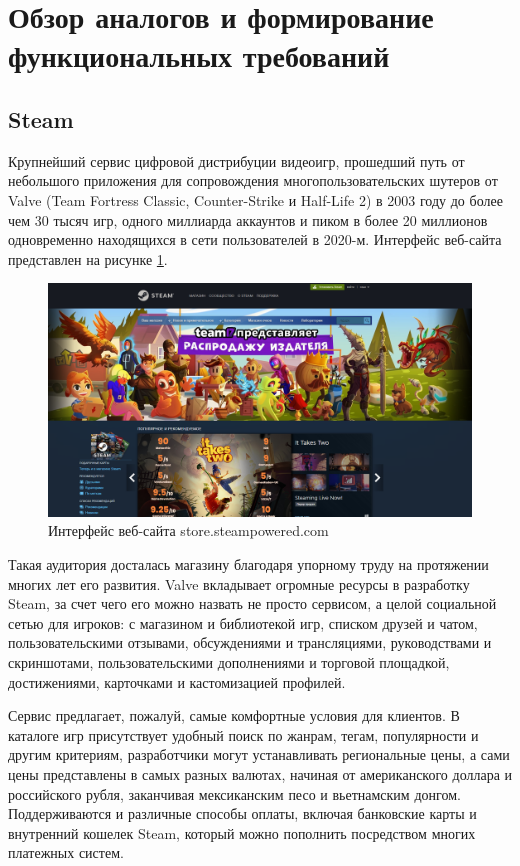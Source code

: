 \section{Обзор аналогов и формирование функциональных требований}
\label{sec:analogues}

\subsection{Steam}
\label{sec:analogues:steam}

Крупнейший сервис цифровой дистрибуции видеоигр, прошедший путь от небольшого приложения для сопровождения многопользовательских шутеров от Valve (Team Fortress Classic, Counter-Strike и Half-Life 2) в 2003 году до более чем 30 тысяч игр, одного миллиарда аккаунтов и пиком в более 20 миллионов одновременно находящихся в сети пользователей в 2020-м.
Интерфейс веб-сайта представлен на рисунке \ref*{sec:analogues:steam:layout}.

\begin{figure}[!htb]
	\centering
	  \includegraphics[scale=0.35]{attachments/steam.png}  
	  \caption{ Интерфейс веб-сайта store.steampowered.com }
	  \label{sec:analogues:steam:layout}
\end{figure}

Такая аудитория досталась магазину благодаря упорному труду на протяжении многих лет его развития. Valve вкладывает огромные ресурсы в разработку Steam, за счет чего его можно назвать не просто сервисом, а целой социальной сетью для игроков: с магазином и библиотекой игр, списком друзей и чатом, пользовательскими отзывами, обсуждениями и трансляциями, руководствами и скриншотами, пользовательскими дополнениями и торговой площадкой, достижениями, карточками и кастомизацией профилей.

Сервис предлагает, пожалуй, самые комфортные условия для клиентов. В каталоге игр присутствует удобный поиск по жанрам, тегам, популярности и другим критериям, разработчики могут устанавливать региональные цены, а сами цены представлены в самых разных валютах, начиная от американского доллара и российского рубля, заканчивая мексиканским песо и вьетнамским донгом. Поддерживаются и различные способы оплаты, включая банковские карты и внутренний кошелек Steam, который можно пополнить посредством многих платежных систем.

